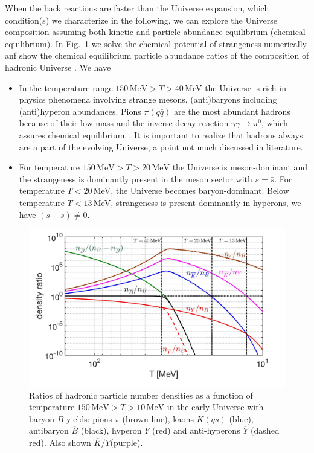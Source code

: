 \documentclass[universe,article,submit,moreauthors,pdftex,a4paper]{Definitions/mdpi}
\begin{document}
When the back reactions are faster than the Universe expansion, which condition(s) we characterize in the following, we can explore the Universe composition assuming both kinetic and particle abundance equilibrium (chemical equilibrium). In Fig.~\ref{EquilibPartRatiosFig} we solve the chemical potential of strangeness numerically anf show the chemical equilibrium particle abundance ratios of the composition of hadronic Universe \cite{Yang:2021bko}. We have
\begin{itemize}
\item
In the temperature range $150\,\mathrm{MeV} >T >40$\,MeV the Universe is rich in physics phenomena involving strange mesons, (anti)baryons including (anti)hyperon abundances. Pions $\pi(q\bar q)$ are the most abundant hadrons because of their low mass and the inverse decay reaction $\gamma\gamma\rightarrow\pi^0$, which assures chemical equilibrium~\cite{Kuznetsova:2008jt}. It is important to realize that hadrons always are a part of the evolving Universe, a point not much discussed in literature.

\item
For temperature $150\,\mathrm{MeV}>T>20\,\mathrm{MeV}$ the Universe is meson-dominant and the strangeness is dominantly present in the meson sector with $s=\bar s$. For temperature $T<20$\,MeV, the Universe becomes baryon-dominant. Below temperature $T<13$\,MeV, strangeness is present dominantly in hyperons, we have $(s -\bar s)\ne 0$.
\end{itemize}
\begin{figure}[bt]
\centering
\includegraphics[width=\textwidth]{./plots/Meson_Baryon_density_ratio_CTYang.jpg}
\caption{Ratios of hadronic particle number densities as a function of temperature $150\,\mathrm{MeV}> T>10\,\mathrm{MeV}$ in the early Universe with baryon $B$ yields: pions $\pi$ (brown line), kaons $K( q\bar s)$ (blue), antibaryon $\overline B$ (black), hyperon $Y$ (red) and anti-hyperons $\overline Y$ (dashed red). Also shown $\overline K/Y$(purple).}
\label{EquilibPartRatiosFig}
\end{figure}
\end{document}
